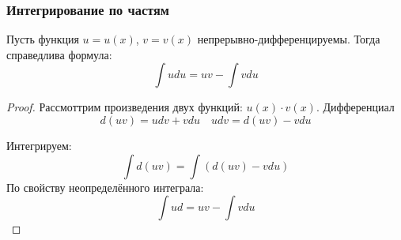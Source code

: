 \subsubsection{Интегрирование по частям}

Пусть функция $u = u(x)$, $v = v(x)$ непрерывно-дифференцируемы.
Тогда справедлива формула: \[
  \int u du = uv - \int v du
\] 

\begin{proof}
  Рассмоттрим произведения двух функций: $u(x) \cdot v(x)$.
  Дифференциал \[
    d(uv) = u dv + v du \quad u dv = d(uv) - vdu
  \]

  Интегрируем:  \[
  \int d(uv) = \int(d(uv) - vdu)
  \] 
  По свойству неопределённого интеграла: \[
  \int u d = uv - \int v du
  \] 
\end{proof}

